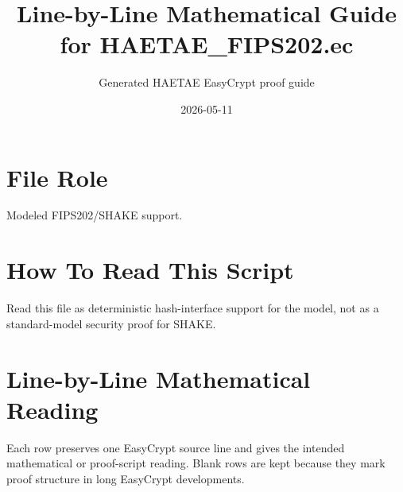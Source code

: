 \documentclass[10pt]{article}
\title{Line-by-Line Mathematical Guide for HAETAE\_FIPS202.ec}
\author{Generated HAETAE EasyCrypt proof guide}
\date{2026-05-11}
\begin{document}
\maketitle

\section*{File Role}
Modeled FIPS202/SHAKE support.

\section*{How To Read This Script}
Read this file as deterministic hash-interface support for the model, not as a standard-model security proof for SHAKE.

\section*{Line-by-Line Mathematical Reading}
Each row preserves one EasyCrypt source line and gives the intended mathematical
or proof-script reading.  Blank rows are kept because they mark proof structure
in long EasyCrypt developments.
\end{document}
